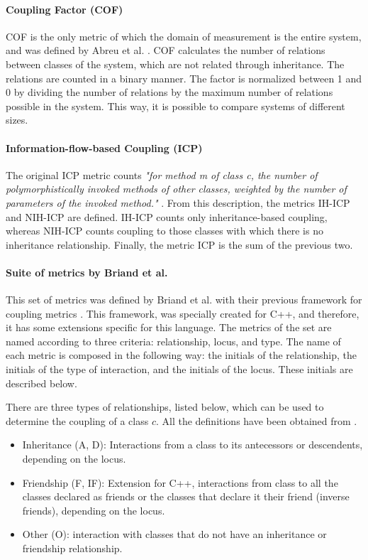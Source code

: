 \paragraph{Coupling Factor (COF)} COF is the only metric of which the domain of measurement is the entire system, and was defined by Abreu et al. \cite{abreu1995toward}. COF calculates the number of relations between classes of the system, which are not related through inheritance. The relations are counted in a binary manner. The factor is normalized between 1 and 0 by dividing the number of relations by the maximum number of relations possible in the system. This way, it is possible to compare systems of different sizes.

\paragraph{Information-flow-based Coupling (ICP)} The original ICP metric counts \textit{"for method m of class c, the number of polymorphistically invoked methods of other classes, weighted by the number of parameters of the invoked method."} . From this description, the metrics IH-ICP and NIH-ICP are defined. IH-ICP counts only inheritance-based coupling, whereas NIH-ICP counts coupling to those classes with which there is no inheritance relationship. Finally, the metric ICP is the sum of the previous two.

\paragraph{Suite of metrics by Briand et al.} This set of metrics was defined by Briand et al. with their previous framework for coupling metrics \cite{briand1997investigation}. This framework, was specially created for C++, and therefore, it has some extensions specific for this language.
The metrics of the set are named according to three criteria: relationship, locus, and type. The name of each metric is composed in the following way: the initials of the relationship, the initials of the type of interaction, and the initials of the locus. These initials are described below.

\blankl
There are three types of relationships, listed below, which can be used to determine the coupling of a class $c$. All the definitions have been obtained from \cite{briand1997investigation}.

\begin{itemize}
  \item Inheritance (A, D): Interactions from a class to its antecessors or descendents, depending on the locus.
  \item Friendship (F, IF): Extension for C++, interactions from class to all the  classes declared as friends or the classes that declare it their friend (inverse friends), depending on the locus.
  \item Other (O): interaction with classes that do not have an inheritance or friendship relationship.
\end{itemize}

